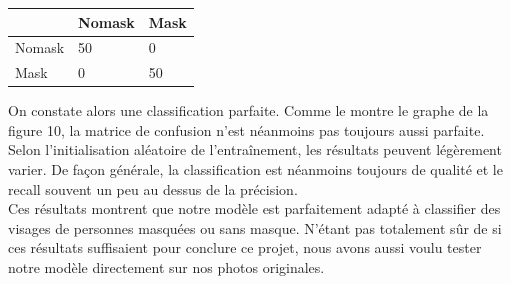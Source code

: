 \documentclass{article}
\begin{document}
\begin{tabular}{ |p{2cm}||p{2cm}|p{2cm}| }
 \hline
   & Nomask &Mask \\
 \hline
  Nomask & 50 & 0 \\
 Mask & 0 & 50 \\
 \hline
\end{tabular}

On constate alors une classification parfaite. Comme le montre le graphe de la figure 10, la matrice de confusion n'est néanmoins pas toujours aussi parfaite. Selon l'initialisation aléatoire de l'entraînement, les résultats peuvent légèrement varier. De façon générale, la classification est néanmoins toujours de qualité et le recall souvent un peu au dessus de la précision. \\

Ces résultats montrent que notre modèle est parfaitement adapté à classifier des visages de personnes masquées ou sans masque. N'étant pas totalement sûr de si ces résultats suffisaient pour conclure ce projet, nous avons aussi voulu tester notre modèle directement sur nos photos originales.
\end{document}
